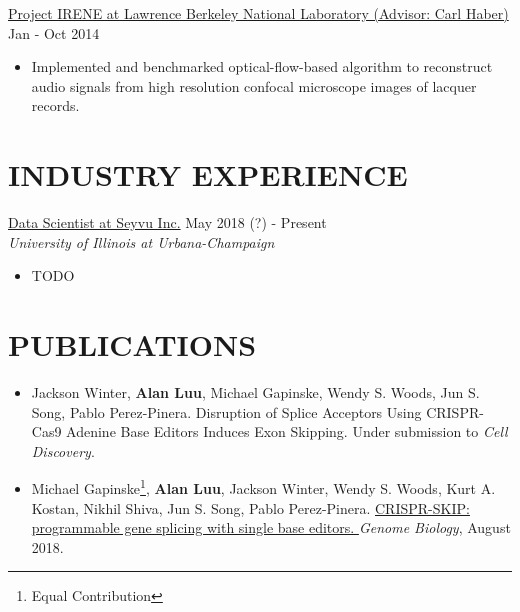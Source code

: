 \documentclass{res}
\begin{document}
\begin{resume}
\begin{itemize}
\end{itemize}
\href{https://irene.lbl.gov/}{Project IRENE at Lawrence Berkeley National Laboratory (Advisor: Carl Haber)}  \hfill Jan - Oct 2014\\
\begin{itemize}
\item {\normalfont Implemented and benchmarked optical-flow-based algorithm to reconstruct audio signals from high resolution confocal microscope images of lacquer records.}
\end{itemize}
\section{INDUSTRY EXPERIENCE}
\href{https://seyvu.ai/}{Data Scientist at Seyvu Inc.}  \hfill May 2018 (?) - Present \\ {\sl University of Illinois at Urbana-Champaign}\\
\begin{itemize}
\item TODO
\end{itemize}
\newpage
\section{PUBLICATIONS}
\begin{itemize}[leftmargin=0in,label={}]
\item Jackson Winter, \textbf{Alan Luu}, Michael Gapinske, Wendy S. Woods,
Jun S. Song, Pablo Perez-Pinera. Disruption of Splice Acceptors Using CRISPR-Cas9 Adenine Base Editors Induces Exon Skipping. Under submission to \textit{Cell Discovery}.
\item Michael Gapinske\footnote{Equal Contribution}, \textbf{Alan Luu}\footnotemark[1], Jackson Winter, Wendy S. Woods, Kurt A. Kostan, Nikhil Shiva, Jun S. Song, Pablo Perez-Pinera. \href{https://www.ncbi.nlm.nih.gov/pmc/articles/PMC6092781/}{CRISPR-SKIP: programmable gene splicing with single base editors.
} \textit{Genome Biology}, August 2018.
\end{itemize}
\vspace{-10pt}

\end{resume}
\end{document}
